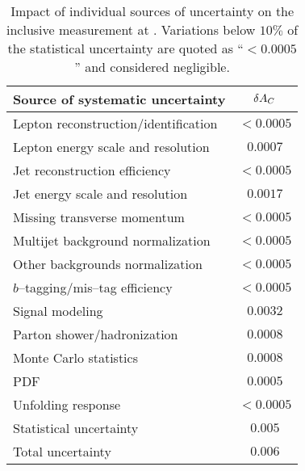 \begin{table}[!htb]\centering
\begin{tabular}{l c}
\toprule
Source of systematic uncertainty  & $\delta{\ensuremath{A_C}{}}$ \\
\midrule
Lepton reconstruction/identification    & $<0.0005$\\
Lepton energy scale and resolution      &  $0.0007$\\
Jet reconstruction efficiency                 &  $<0.0005$ \\
Jet energy scale and resolution             &  $0.0017$ \\
Missing transverse momentum       & $<0.0005$\\
Multijet background normalization & $<0.0005$\\
Other backgrounds normalization        & $<0.0005$\\
$b$--tagging/mis--tag efficiency       & $<0.0005$\\
Signal modeling                                    & $0.0032$\\
Parton shower/hadronization                & $0.0008$\\
Monte Carlo statistics                            & $0.0008$\\
PDF                                                        &$0.0005$\\
Unfolding response                               &$<0.0005$\\
\midrule
Statistical uncertainty                           & $0.005$ \\
\midrule
Total uncertainty                                   & $0.006$ \\
\bottomrule
\end{tabular}
\caption{
  Impact of individual sources of uncertainty on the inclusive
  \ac{} measurement at \eighttev{}. Variations below $10\%$ of the statistical
  uncertainty are quoted as ``$<0.0005$'' and considered negligible.}
\label{tab:8tevsystematics}
\end{table}

